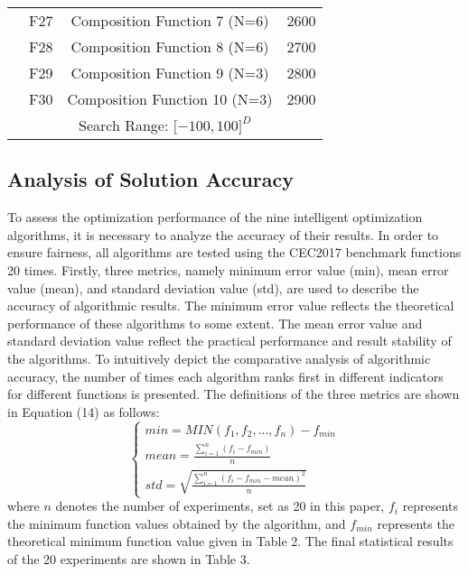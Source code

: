 \documentclass[preprint,review,compress,12pt]{elsarticle}
\begin{document}
\begin{table}[H]
\begin{tabular}{cccc}
                        & F27 & Composition   Function 7 (N=6)                            & 2600 \\
                        & F28 & Composition   Function 8 (N=6)                            & 2700 \\
                        & F29 & Composition   Function 9 (N=3)                            & 2800 \\
                        & F30 & Composition   Function 10 (N=3)                           & 2900 \\
\midrule
\multicolumn{4}{c}{Search Range:   ${[}-100,100{]}^D$ } \\   
\bottomrule     
\end{tabular}
\end{table}


\subsection{Analysis of Solution Accuracy}
To assess the optimization performance of the nine intelligent optimization algorithms, it is necessary to analyze the accuracy of their results. In order to ensure fairness, all algorithms are tested using the CEC2017 benchmark functions 20 times. Firstly, three metrics, namely minimum error value (min), mean error value (mean), and standard deviation value (std), are used to describe the accuracy of algorithmic results. The minimum error value reflects the theoretical performance of these algorithms to some extent. The mean error value and standard deviation value reflect the practical performance and result stability of the algorithms. To intuitively depict the comparative analysis of algorithmic accuracy, the number of times each algorithm ranks first in different indicators for different functions is presented. The definitions of the three metrics are shown in Equation (14) as follows:
\begin{equation}
\left\{\begin{matrix}min =  MIN(f_1,f_2,...,f_n)-f_{min}\\mean =   \frac{{\textstyle \sum_{i=1}^{n} \left (  f_{i}-f_{min}\right ) }}{n}  \\std = \sqrt{\frac{{\textstyle \sum_{i=1}^{n}\left ( f_{i}-f_{min}-mean \right )^2 }}{n} } \end{matrix}\right.
\end{equation}
where $n$ denotes the number of experiments, set as 20 in this paper, $f_i$ represents the minimum function values obtained by the algorithm, and $f_{min}$ represents the theoretical minimum function value given in Table 2. The final statistical results of the 20 experiments are shown in Table 3.
\end{document}
